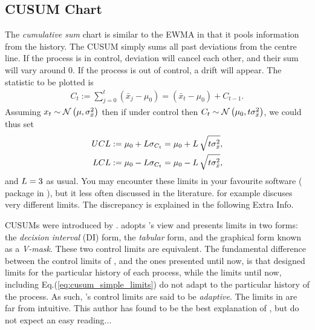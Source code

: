 \subsection[CUSUM]{CUSUM Chart}
The \emph{cumulative sum} chart is similar to the EWMA in that it pools information from the history. 
The CUSUM simply sums all past deviations from the centre line.
If the process is in control, deviation will cancel each other, and their sum will vary around $0$. 
If the process is out of control, a drift will appear. 
The statistic to be plotted is 
\begin{align}
	C_t:= \sum_{j=0}^{t}(\bar{x}_j-\mu_0) = (\bar{x}_t-\mu_0) + C_{t-1}.
\end{align} 
Assuming $x_t \sim \mathcal{N}\left(\mu, \sigma_{\bar{x}}^2\right)$ then if under control then $C_t \sim \mathcal{N}\left(\mu_0, t \sigma_{\bar{x}}^2\right)$, we could thus set 
\begin{align}
\label{eq:cusum_simple_limits}
\begin{split}
	UCL &:= \mu_0 + L \sigma_{C_t}= \mu_0 + L \, \sqrt{t \sigma_{\bar{x}}^2},  \\
	LCL &:= \mu_0 - L \sigma_{C_t}= \mu_0 - L \, \sqrt{t \sigma_{\bar{x}}^2},
\end{split}
\end{align}
and $L=3$ as usual. 
You may encounter these limits in your favourite software ( package in \R), but it less often discussed in the literature. \cite{montgomery_introduction_2007} for example discuses very different limits. The discrepancy is explained in the following Extra Info. 

\begin{extra}
CUSUMs were introduced by \cite{page_continuous_1954}. 
\cite{montgomery_introduction_2007} adopts \citeauthor{page_continuous_1954}'s view and presents limits in two forms: the \emph{decision interval} (DI) form, \aka the \emph{tabular} form, and the graphical form known as a \emph{V-mask}.
These two control limits are equivalent. 
The fundamental difference between the control limits of \cite{page_continuous_1954}, and the ones presented until now, is that \citeauthor{page_continuous_1954} designed limits for the particular history of each process, while the limits until now, including Eq.(\ref{eq:cusum_simple_limits}) do not adapt to the particular history of the process.
As such, \citeauthor{page_continuous_1954}'s control limits are said to be \emph{adaptive}.
The limits in \cite{page_continuous_1954} are far from intuitive. 
This author has found \cite{ritov_decision_1990} to be the best explanation of \cite{page_continuous_1954}, but do not expect an easy reading...
\end{extra}









